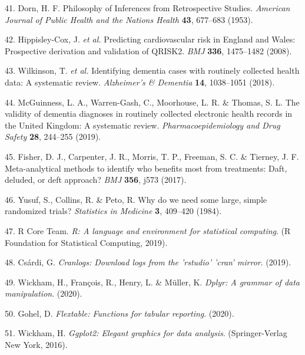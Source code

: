 \documentclass[a4paper, twoside]{templates/ociamthesis}
\begin{document}
\leavevmode\hypertarget{ref-dorn1953}{}%
41. Dorn, H. F. Philosophy of Inferences from Retrospective Studies. \emph{American Journal of Public Health and the Nations Health} \textbf{43}, 677--683 (1953).

\leavevmode\hypertarget{ref-hippisley-cox2008}{}%
42. Hippisley-Cox, J. \emph{et al.} Predicting cardiovascular risk in England and Wales: Prospective derivation and validation of QRISK2. \emph{BMJ} \textbf{336}, 1475--1482 (2008).

\leavevmode\hypertarget{ref-wilkinson2018a}{}%
43. Wilkinson, T. \emph{et al.} Identifying dementia cases with routinely collected health data: A systematic review. \emph{Alzheimer's \& Dementia} \textbf{14}, 1038--1051 (2018).

\leavevmode\hypertarget{ref-mcguinness2019c}{}%
44. McGuinness, L. A., Warren-Gash, C., Moorhouse, L. R. \& Thomas, S. L. The validity of dementia diagnoses in routinely collected electronic health records in the United Kingdom: A systematic review. \emph{Pharmacoepidemiology and Drug Safety} \textbf{28}, 244--255 (2019).

\leavevmode\hypertarget{ref-fisher2017}{}%
45. Fisher, D. J., Carpenter, J. R., Morris, T. P., Freeman, S. C. \& Tierney, J. F. Meta-analytical methods to identify who benefits most from treatments: Daft, deluded, or deft approach? \emph{BMJ} \textbf{356}, j573 (2017).

\leavevmode\hypertarget{ref-yusuf1984}{}%
46. Yusuf, S., Collins, R. \& Peto, R. Why do we need some large, simple randomized trials? \emph{Statistics in Medicine} \textbf{3}, 409--420 (1984).

\leavevmode\hypertarget{ref-base}{}%
47. R Core Team. \emph{R: A language and environment for statistical computing}. (R Foundation for Statistical Computing, 2019).

\leavevmode\hypertarget{ref-cranlogs}{}%
48. Csárdi, G. \emph{Cranlogs: Download logs from the 'rstudio' 'cran' mirror}. (2019).

\leavevmode\hypertarget{ref-dplyr}{}%
49. Wickham, H., François, R., Henry, L. \& Müller, K. \emph{Dplyr: A grammar of data manipulation}. (2020).

\leavevmode\hypertarget{ref-flextable}{}%
50. Gohel, D. \emph{Flextable: Functions for tabular reporting}. (2020).

\leavevmode\hypertarget{ref-ggplot2}{}%
51. Wickham, H. \emph{Ggplot2: Elegant graphics for data analysis}. (Springer-Verlag New York, 2016).
\end{document}
